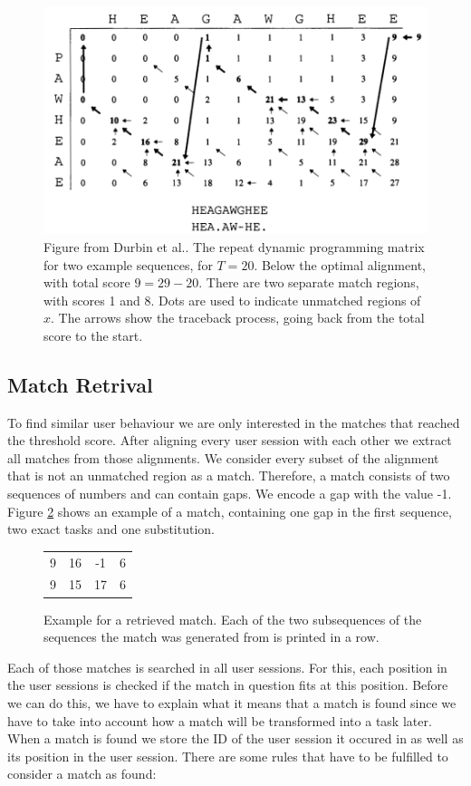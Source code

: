 \begin{figure}
\centering
\includegraphics[scale=0.4]{chapters/approach/smithwatermanrepeated.png}
\caption{Figure from Durbin et al.\cite{durbin1998}. The repeat dynamic programming matrix for two example sequences, for $T = 20$. Below the optimal alignment, with total score \mbox{$9 = 29-20$}. There are two separate match regions, with scores 1 and 8. Dots are used to indicate unmatched regions of $x$. The arrows show the traceback process, going back from the total score to the start.}
\label{fig:durbindpmatrixtraceback}
\end{figure}

\subsection{Match Retrival}
To find similar user behaviour we are only interested in the matches that reached the threshold score.
After aligning every user session with each other we extract all matches from those alignments.
We consider every subset of the alignment that is not an unmatched region as a match.
Therefore, a match consists of two sequences of numbers and can contain gaps.
We encode a gap with the value -1.
Figure \ref{fig:matchexample} shows an example of a match, containing one gap in the first sequence, two exact tasks and one substitution.

\begin{figure}[h]
	\centering
	\begin{tabular}{cccc}
		9 & 16 & -1 & 6 \\
		9 & 15 & 17 & 6
	\end{tabular}
	\caption{Example for a retrieved match. Each of the two subsequences of the sequences the match was generated from is printed in a row.}
	\label{fig:matchexample}
\end{figure}
Each of those matches is searched in all user sessions.
For this, each position in the user sessions is checked if the match in question fits at this position.
Before we can do this, we have to explain what it means that a match is found since we have to take into account how a match will be transformed into a task later.
When a match is found we store the ID of the user session it occured in as well as its position in the user session.
There are some rules that have to be fulfilled to consider a match as found:

